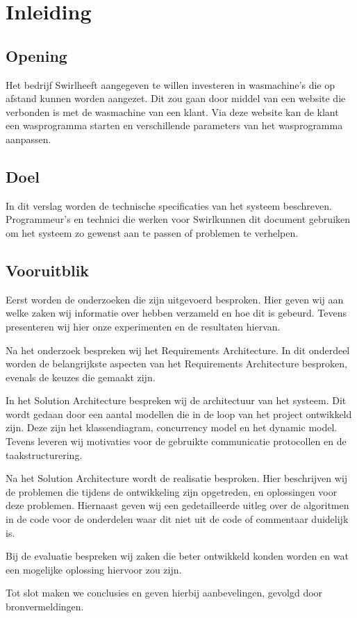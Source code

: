 \chapter{Inleiding}
\section{Opening}
Het bedrijf Swirl\textregistered heeft aangegeven te willen investeren in wasmachine's die op afstand kunnen worden aangezet.
Dit zou gaan door middel van een website die verbonden is met de wasmachine van een klant. Via deze website kan de klant een wasprogramma starten en verschillende parameters van het wasprogramma aanpassen.

\section{Doel}
In dit verslag worden de technische specificaties van het systeem beschreven.
Programmeur's en technici die werken voor Swirl\textregistered kunnen dit document gebruiken om het systeem zo gewenst aan te passen of problemen te verhelpen.

\section{Vooruitblik}
Eerst worden de onderzoeken die zijn uitgevoerd besproken.
Hier geven wij aan welke zaken wij informatie over hebben verzameld en hoe dit is gebeurd. Tevens presenteren wij hier onze experimenten en de resultaten hiervan.

Na het onderzoek bespreken wij het Requirements Architecture. In dit onderdeel worden de belangrijkste aspecten van het Requirements Architecture besproken, evenals de keuzes die gemaakt zijn.

In het Solution Architecture bespreken wij de architectuur van het systeem. Dit wordt gedaan door een aantal modellen die in de loop van het project ontwikkeld zijn. Deze zijn het klassendiagram, concurrency model en het dynamic model.
Tevens leveren wij motivaties voor de gebruikte communicatie protocollen en de taakstructurering.

Na het Solution Architecture wordt de realisatie besproken. Hier beschrijven wij de problemen die tijdens de ontwikkeling zijn opgetreden, en oplossingen voor deze problemen.
Hiernaast geven wij een gedetailleerde uitleg over de algoritmen in de code voor de onderdelen waar dit niet uit de code of commentaar duidelijk is.

Bij de evaluatie bespreken wij zaken die beter ontwikkeld konden worden en wat een mogelijke oplossing hiervoor zou zijn.

Tot slot maken we conclusies en geven hierbij aanbevelingen, gevolgd door bronvermeldingen.